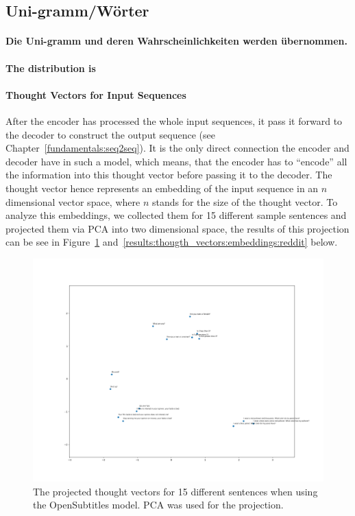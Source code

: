 \subsection{Uni-gramm/Wörter}
\paragraph{Die Uni-gramm und deren Wahrscheinlichkeiten werden übernommen.}
\paragraph{The distribution is}

\paragraph{Thought Vectors for Input Sequences} After the encoder has processed the whole input sequences, it pass it forward to the decoder to construct the output sequence (see Chapter~\ref{fundamentals:seq2seq}). It is the only direct connection the encoder and decoder have in such a model, which means, that the encoder has to ``encode'' all the information into this thought vector before passing it to the decoder. The thought vector hence represents an embedding of the input sequence in an $n$ dimensional vector space, where $n$ stands for the size of the thought vector. To analyze this embeddings, we collected them for 15 different sample sentences and projected them via PCA into two dimensional space, the results of this projection can be see in Figure~\ref{results:thougth_vectors:embeddings:opensubtitles} and~\ref{results:thougth_vectors:embeddings:reddit} below.

\begin{figure}[H]
	\centering
	\includegraphics[width=16cm]{img/opensubtitles_thought_vector_embeddings.png}
	\caption{The projected thought vectors for 15 different sentences when using the OpenSubtitles model. PCA was used for the projection.}
	\label{results:thougth_vectors:embeddings:opensubtitles}
\end{figure}


